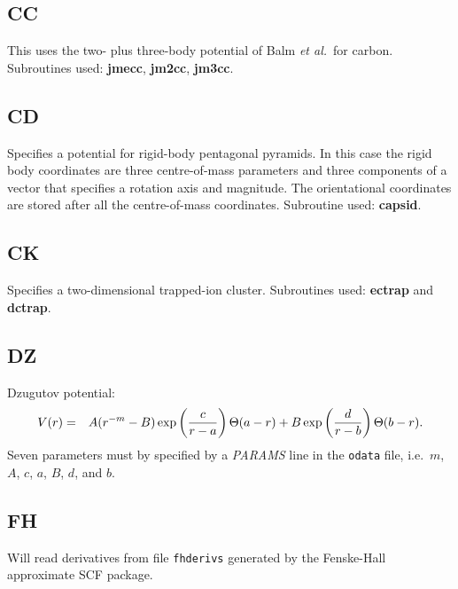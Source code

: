 \documentclass[12pt,a4paper,dvips]{article}
\newcommand{\etal}{{\it et al.}}
\begin{document}
\subsection{CC}This uses the two- plus three-body potential of Balm \etal\ for carbon.\cite{balmakm91} 
Subroutines used: {\bf jmecc}, {\bf jm2cc}, {\bf jm3cc}.

\subsection{CD}Specifies a potential for rigid-body pentagonal pyramids. In this case the
rigid body coordinates are three centre-of-mass parameters and three components of a 
vector that specifies a rotation axis and magnitude. The orientational coordinates are stored
after all the centre-of-mass coordinates. Subroutine used: {\bf capsid}.


\subsection{CK}Specifies a two-dimensional trapped-ion cluster. Subroutines used:
{\bf ectrap} and {\bf dctrap}.

\subsection{DZ}Dzugutov potential:\cite{Dzugutov92,Dzugutov93b}
\begin{eqnarray}
V(r)&=&A(r^{-m}-B) \exp\left( {c\over r-a}\right) \Theta(a-r) + 
    B \exp\left({d\over r-b}\right) \Theta(b-r). \nonumber
\end{eqnarray}
Seven parameters must by specified by a {\it PARAMS\/} line in the {\tt odata} file,
i.e.~$m$, $A$, $c$, $a$, $B$, $d$, and $b$.

\subsection{FH}Will read derivatives from file {\tt fhderivs} generated by the Fenske-Hall approximate
SCF package.\cite{hallf72}
\end{document}
